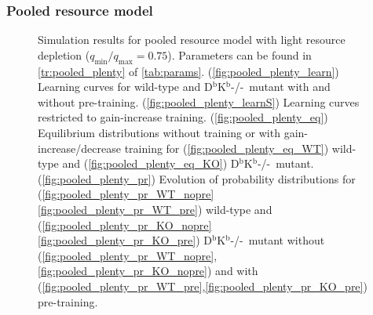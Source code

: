 \documentclass[12pt]{article}
\newcommand{\KO}{D$^\mathrm{b}$K$^\mathrm{b}$-/-}
\newcommand{\lmax}{_{\text{max}}}
\newcommand{\lmin}{_{\text{min}}}
\begin{document}
\subsubsection{Pooled resource model}\label{sec:pooled}

\begin{figure}
 \begin{center}
 \begin{myenuma}
  \item{}\label{fig:pooled_plenty_learn}
  \item{}\label{fig:pooled_plenty_learnS}
  \item\label{fig:pooled_plenty_eq}\begin{myenumi}
                    \item{}\label{fig:pooled_plenty_eq_WT}
                    \item{}\label{fig:pooled_plenty_eq_KO}
                  \end{myenumi}
  \item\label{fig:pooled_plenty_pr}\begin{myenumi}
                    \item{}\label{fig:pooled_plenty_pr_WT_nopre}
                    \item{}\label{fig:pooled_plenty_pr_WT_pre}
                    \item{}\label{fig:pooled_plenty_pr_KO_nopre}
                    \item{}\label{fig:pooled_plenty_pr_KO_pre}
                  \end{myenumi}
 \end{myenuma}
 \end{center}
  \caption{Simulation results for pooled resource model with light resource depletion ($q\lmin/q\lmax=0.75$).
  Parameters can be found in \autoref{tr:pooled_plenty} of \autoref{tab:params}.
  (\ref{fig:pooled_plenty_learn}) Learning curves for wild-type and \KO\ mutant with and without pre-training.
  (\ref{fig:pooled_plenty_learnS}) Learning curves restricted to gain-increase training.
  (\ref{fig:pooled_plenty_eq}) Equilibrium distributions without training or with gain-increase/decrease training for (\ref{fig:pooled_plenty_eq_WT}) wild-type and (\ref{fig:pooled_plenty_eq_KO}) \KO\ mutant.
  (\ref{fig:pooled_plenty_pr}) Evolution of probability distributions for (\ref{fig:pooled_plenty_pr_WT_nopre}\ref{fig:pooled_plenty_pr_WT_pre}) wild-type and  (\ref{fig:pooled_plenty_pr_KO_nopre}\ref{fig:pooled_plenty_pr_KO_pre}) \KO\ mutant without (\ref{fig:pooled_plenty_pr_WT_nopre},\ref{fig:pooled_plenty_pr_KO_nopre}) and with (\ref{fig:pooled_plenty_pr_WT_pre},\ref{fig:pooled_plenty_pr_KO_pre}) pre-training. } \label{fig:pooled_plenty}
\end{figure}
\end{document}
